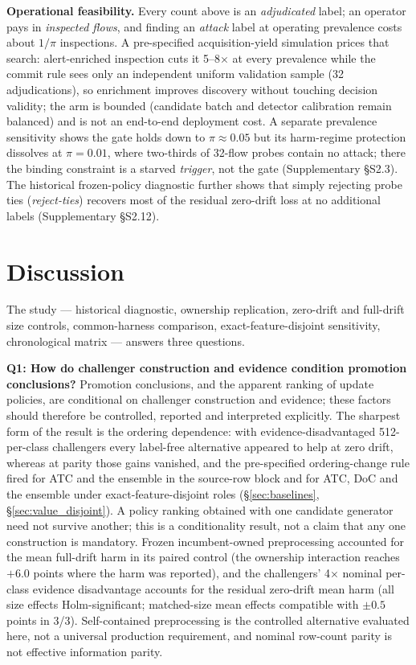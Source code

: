 \documentclass[journal]{IEEEtran}
\begin{document}


\textbf{Operational feasibility.} Every count above is an \emph{adjudicated} label; an operator pays in \emph{inspected flows}, and finding an \emph{attack} label at operating prevalence costs about $1/\pi$ inspections. A pre-specified acquisition-yield simulation prices that search: alert-enriched inspection cuts it 5--8$\times$ at every prevalence while the commit rule sees only an independent uniform validation sample (32 adjudications), so enrichment improves discovery without touching decision validity; the arm is bounded (candidate batch and detector calibration remain balanced) and is not an end-to-end deployment cost. A separate prevalence sensitivity shows the gate holds down to $\pi \approx 0.05$ but its harm-regime protection dissolves at $\pi = 0.01$, where two-thirds of 32-flow probes contain no attack; there the binding constraint is a starved \emph{trigger}, not the gate (Supplementary \S S2.3). The historical frozen-policy diagnostic further shows that simply rejecting probe ties (\emph{reject-ties}) recovers most of the residual zero-drift loss at no additional labels (Supplementary \S S2.12).

\section{Discussion}


The study --- historical diagnostic, ownership replication, zero-drift and full-drift size controls, common-harness comparison, exact-feature-disjoint sensitivity, chronological matrix --- answers three questions.

\textbf{Q1: How do challenger construction and evidence condition promotion conclusions?} Promotion conclusions, and the apparent ranking of update policies, are conditional on challenger construction and evidence; these factors should therefore be controlled, reported and interpreted explicitly. The sharpest form of the result is the ordering dependence: with evidence-disadvantaged 512-per-class challengers every label-free alternative appeared to help at zero drift, whereas at parity those gains vanished, and the pre-specified ordering-change rule fired for ATC and the ensemble in the source-row block and for ATC, DoC and the ensemble under exact-feature-disjoint roles (\S\ref{sec:baselines}, \S\ref{sec:value_disjoint}). A policy ranking obtained with one candidate generator need not survive another; this is a conditionality result, not a claim that any one construction is mandatory. Frozen incumbent-owned preprocessing accounted for the mean full-drift harm in its paired control (the ownership interaction reaches $+6.0$ points where the harm was reported), and the challengers' 4$\times$ nominal per-class evidence disadvantage accounts for the residual zero-drift mean harm (all size effects Holm-significant; matched-size mean effects compatible with $\pm0.5$ points in 3/3). Self-contained preprocessing is the controlled alternative evaluated here, not a universal production requirement, and nominal row-count parity is not effective information parity.
\end{document}
